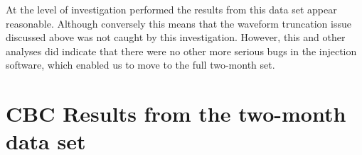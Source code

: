 At the level of investigation performed the results from this data set
appear reasonable.  Although conversely this means that the waveform
truncation issue discussed above was not caught by this investigation.
However, this and other analyses did indicate that there were no other
more serious bugs in the injection software, which enabled us to move
to the full two-month set.

\section{CBC Results from the two-month data set}
\label{sec:ninjna2_two_months}

